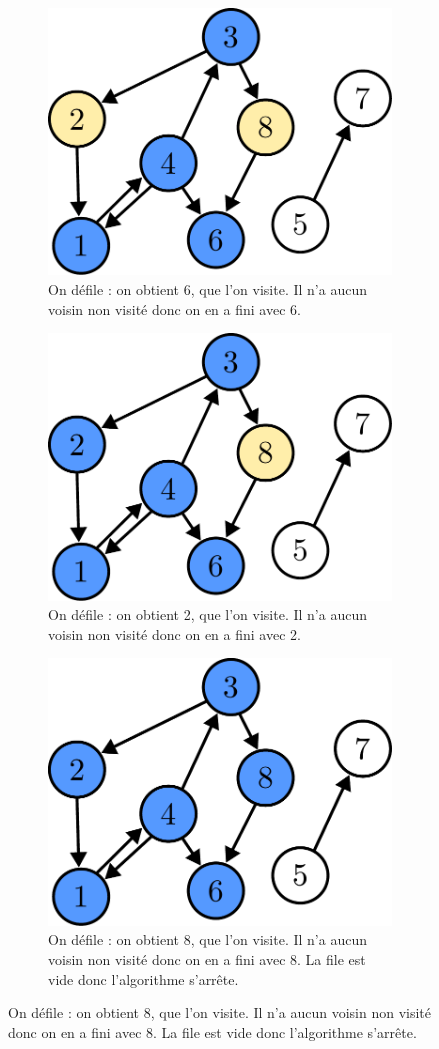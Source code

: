 \documentclass{article}
\begin{document}
\begin{itemize}
\begin{figure}[b]
\begin{subfigure}[t]{0.3\linewidth}
			\includegraphics[width=0.9\linewidth]{../figures/bfs9.pdf}
			\caption{On défile : on obtient 6, que l'on visite. Il n'a aucun voisin non visité donc on en a fini avec 6.}
		\end{subfigure}
	
		\begin{subfigure}[t]{0.45\linewidth}
			\centering
			\includegraphics[width=0.6\linewidth]{../figures/bfs10.pdf}
			\caption{On défile : on obtient 2, que l'on visite. Il n'a aucun voisin non visité donc on en a fini avec 2.}
		\end{subfigure}\hfill%
		\begin{subfigure}[t]{0.45\linewidth}
			\centering
			\includegraphics[width=0.6\linewidth]{../figures/bfs11.pdf}
			\caption{On défile : on obtient 8, que l'on visite. Il n'a aucun voisin non visité donc on en a fini avec 8. La file est vide donc l'algorithme s'arrête.}
		\end{subfigure}
	\end{figure}
\end{itemize}
\end{document}

